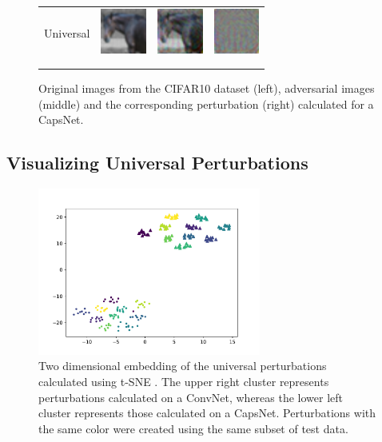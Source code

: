 \documentclass{article}
\begin{document}
\begin{figure}[h]
\begin{tabular}{rlll}
		\\
		Universal & \includegraphics[height=1.5cm, align=c]{../figures/universal_orig.pdf} & \includegraphics[height=1.5cm, align=c]{../figures/universal_adversarial.pdf} & \includegraphics[height=1.5cm, align=c]{../figures/universal_diff.pdf}\\
		\\
		\vspace{0.1cm}\\
	\end{tabular}
	\caption{Original images from the CIFAR10 dataset (left), adversarial images (middle) and the corresponding perturbation (right) calculated for a CapsNet.\label{tab:images}}
\end{figure}


\subsection{Visualizing Universal Perturbations}

\begin{figure}[h]
	\centering
	\includegraphics[height=5.5cm]{../figures/tsne.pdf}
	\caption{Two dimensional embedding of the universal perturbations calculated using t-SNE \cite{tsne}. The upper right cluster represents perturbations calculated on a ConvNet, whereas the lower left cluster represents those calculated on a CapsNet. Perturbations with the same color were created using the same subset of test data.}
	\label{fig:tsne}
\end{figure}
\end{document}
